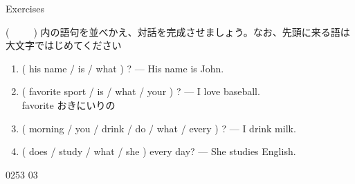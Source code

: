 \documentclass[aspectratio=169,xcolor={dvipsnames,table}]{beamer}
\begin{document}
\begin{frame}[plain]{Exercises}
 

(~~~~~) 内の語句を並べかえ、対話を完成させましょう。なお、先頭に来る語は大文字ではじめてください
\begin{enumerate}
 \item ( his name / is / what ) ? --- His name is John.\\
 \item ( favorite sport / is / what / your ) ? --- I love baseball.\\
\hfill{\scriptsize favorite  おきにいりの}
 \item ( morning / you / drink / do / what / every ) ? --- I drink milk.\\
 \item ( does / study / what / she ) every day? --- She studies English.\\
\end{enumerate}

\mbox{}\hfill{\tiny 0253}\,{\tiny{}\,03}

\end{frame}
\end{document}
